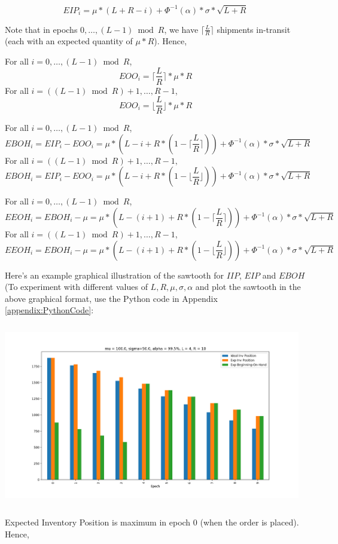 \documentclass[11pt]{amsart}
\begin{document}
\begin{appendices}
$$EIP_i = \mu * (L + R - i) + \Phi^{-1}(\alpha) * \sigma * \sqrt{L+R}$$

Note that in epochs $0, \ldots, (L-1) \bmod R$, we have $\lceil \frac L R \rceil$ shipments in-transit (each with an expected quantity of $\mu * R$). Hence,

For all $i = 0, \ldots, (L - 1) \bmod R$,
$$ EOO_i = \lceil \frac L R \rceil * \mu * R $$
For all $i = ((L - 1) \bmod R) + 1, \ldots, R - 1$,
$$ EOO_i = \lfloor\frac L R \rfloor * \mu * R $$

For all $i = 0, \ldots, (L - 1) \bmod R$, 
$$ EBOH_i = EIP_i - EOO_i = \mu * (L  - i + R * (1 - \lceil \frac L R \rceil)) + \Phi^{-1}(\alpha) * \sigma * \sqrt{L+R} $$
For all  $i = ((L - 1) \bmod R) + 1, \ldots, R - 1,$
$$ EBOH_i = EIP_i - EOO_i = \mu * (L - i + R * (1 - \lfloor \frac L R \rfloor)) + \Phi^{-1}(\alpha) * \sigma * \sqrt{L+R} $$

For all $i = 0, \ldots, (L - 1) \bmod R$,
$$ EEOH_i = EBOH_i - \mu = \mu * (L - (i + 1) + R * (1 - \lceil \frac L R \rceil)) + \Phi^{-1}(\alpha) * \sigma * \sqrt{L+R} $$
For all $i = ((L - 1) \bmod R) + 1, \ldots, R - 1$,
$$ EEOH_i =  EBOH_i - \mu = \mu * (L  - (i + 1) + R * (1 - \lfloor \frac L R \rfloor)) + \Phi^{-1}(\alpha) * \sigma * \sqrt{L+R}$$

Here's an example graphical illustration of the sawtooth for $IIP$, $EIP$ and $EBOH$ (To experiment with different values of $L, R, \mu, \sigma, \alpha$ and plot the sawtooth in the above graphical format, use the Python code in Appendix \ref{appendix:PythonCode}:

\includegraphics[height=80mm, width=130mm]{Purchasing.png}



Expected Inventory Position is maximum in epoch $0$ (when the order is placed). Hence,


\end{appendices}
\end{document}
